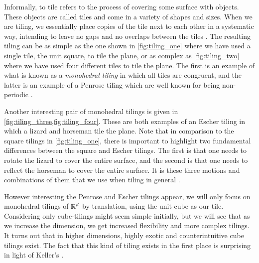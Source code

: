 \documentclass[../thesis.tex]{subfiles}
\begin{document}
Informally, to tile refers to the process of covering some surface with objects. These objects are called tiles and come in a variety of shapes and sizes. When we are tiling, we essentially place copies of the tile next to each other in a systematic way, intending to leave no gaps and no overlaps between the tiles \cite{kolountzakisTilingsTranslation2010}. The resulting tiling can be as simple as the one shown in \cref{fig:tiling_one} where we have used a single tile, the unit square, to tile the plane, or as complex as \cref{fig:tiling_two} where we have used four different tiles to tile the plane. The first is an example of what is known as a \emph{monohedral tiling} in which all tiles are congruent, and the latter is an example of a Penrose tiling which are well known for being non-periodic \cite[p. 20, 531]{grunbaumTilingsPatterns1987}. %



Another interesting pair of monohedral tilings is given in \cref{fig:tiling_three,fig:tiling_four}. These are both examples of an Escher tiling in which a lizard and horseman tile the plane. Note that in comparison to the square tilings in \cref{fig:tiling_one}, there is important to highlight two fundamental differences between the square and Escher tilings. The first is that one needs to rotate the lizard to cover the entire surface, and the second is that one needs to reflect the horseman to cover the entire surface. It is these three motions and combinations of them that we use when tiling in general \cite[p. 26]{kolountzakisTilingsTranslation2010,grunbaumTilingsPatterns1987}. 



However interesting the Penrose and Escher tilings appear, we will only focus on monohedral tilings of $\mathbb{R}^d$ by translation, using the unit cube as our tile. Considering only cube-tilings might seem simple initially, but we will see that as we increase the dimension, we get increased flexibility and more complex tilings. It turns out that in higher dimensions, highly exotic and counterintuitive cube tilings exist. The fact that this kind of tiling exists in the first place is surprising in light of Keller's  \cite{iosevichSpectralTilingProperties1998}.  %
\end{document}
